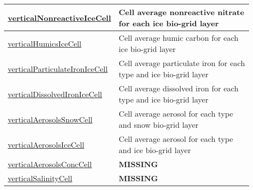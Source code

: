 {\begin{center}
\begin{longtable}{| p{2.0in} | p{4.0in} |}
    \hline
    \hyperref[subsec:var_sec_tracers_aggregate_verticalNonreactiveIceCell]{verticalNonreactiveIceCell} & Cell average nonreactive nitrate for each ice bio-grid layer \\
    \hline
    \hyperref[subsec:var_sec_tracers_aggregate_verticalHumicsIceCell]{verticalHumicsIceCell} & Cell average humic carbon for each ice bio-grid layer \\
    \hline
    \hyperref[subsec:var_sec_tracers_aggregate_verticalParticulateIronIceCell]{verticalParticulateIronIceCell} & Cell average particulate iron for each type and ice bio-grid layer \\
    \hline
    \hyperref[subsec:var_sec_tracers_aggregate_verticalDissolvedIronIceCell]{verticalDissolvedIronIceCell} & Cell average dissolved iron for each type and ice bio-grid layer \\
    \hline
    \hyperref[subsec:var_sec_tracers_aggregate_verticalAerosolsSnowCell]{verticalAerosolsSnowCell} & Cell average aerosol for each type and snow bio-grid layer \\
    \hline
    \hyperref[subsec:var_sec_tracers_aggregate_verticalAerosolsIceCell]{verticalAerosolsIceCell} & Cell average aerosol for each type and ice bio-grid layer \\
    \hline
    \hyperref[subsec:var_sec_tracers_aggregate_verticalAerosolsConcCell]{verticalAerosolsConcCell} & {\bf \color{red} MISSING} \\
    \hline
    \hyperref[subsec:var_sec_tracers_aggregate_verticalSalinityCell]{verticalSalinityCell} & {\bf \color{red} MISSING} \\
    \hline
\end{longtable}
\end{center}
}
